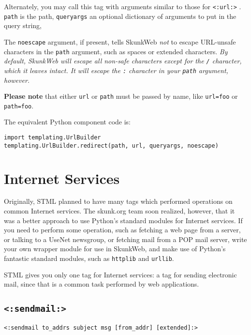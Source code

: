 \documentclass{manual}
\begin{document}
Alternately, you may call this tag with arguments
similar to those for 
\texttt{<:url:>} . 
\texttt{path} is the path, \texttt{queryargs} an optional
dictionary of arguments to put in the query string,


The \texttt{noescape} argument, if present,
tells SkunkWeb \emph{not} to escape URL-unsafe characters in the \texttt{path}
argument, such as spaces or extended characters. \emph{By default,
SkunkWeb will escape all non-safe characters except for the \texttt{/}
character, which it leaves intact. It will escape the \texttt{:}
character in your \texttt{path} argument, however.}


\textbf{Please note} that either \texttt{url} or \texttt{path}
must be passed by name, like \texttt{url=foo} or 
\texttt{path=foo}.



The equivalent Python component code is: 
\begin{verbatim}
import templating.UrlBuilder
templating.UrlBuilder.redirect(path, url, queryargs, noescape)
\end{verbatim}




\chapter{Internet Services}
\label{stmlrefnet}
Originally, STML planned to have many tags
which performed operations on common Internet services.
The skunk.org team soon realized, however, that
it was a better approach to use Python's standard
modules for Internet services. If you need to perform
some operation, such as fetching a web page from a server,
or talking to a UseNet newsgroup, or fetching mail
from a POP mail server, write your own wrapper module
for use in SkunkWeb, and make use of Python's fantastic
standard modules, such as \texttt{httplib} and
\texttt{urllib}.

STML gives you only one tag for Internet services:
a tag for sending electronic mail, since that is
a common task performed by web applications.

\section{\texttt{<:sendmail:>}}
\label{tagsendmail}
\texttt{<:sendmail to_addrs subject msg [from_addr] [extended]:>}
\end{document}
